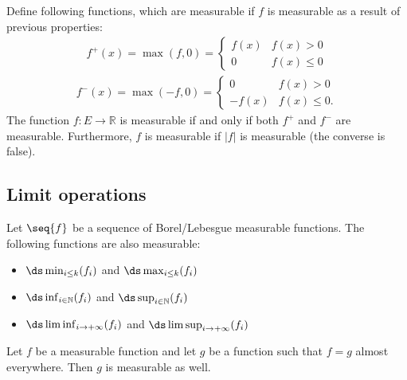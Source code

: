     \begin{property}
        Define following functions, which are measurable if $f$ is measurable as a result of previous properties:
        \begin{gather}
            \label{lebesgue:positive_part}
            f^+(x) = \max(f,0) =
            \begin{cases}
                f(x)&f(x)>0\\
                0&f(x)\leq0
            \end{cases}
        \end{gather}
        \begin{gather}
            \label{lebesgue:negative_part}
            f^-(x) = \max(-f,0) =
            \begin{cases}
                0&f(x)>0\\
                -f(x)&f(x)\leq0.
            \end{cases}
        \end{gather}
        The function $f:E\rightarrow\mathbb{R}$ is measurable if and only if both $f^+$ and $f^-$ are measurable. Furthermore, $f$ is measurable if $|f|$ is measurable (the converse is false).
    \end{property}

\subsection{Limit operations}

    \begin{property}
        Let $\seq{f}$ be a sequence of Borel/Lebesgue measurable functions. The following functions are also measurable:
        \begin{itemize}
            \item $\ds\min_{i\leq k}(f_i)$ and $\ds\max_{i\leq k}(f_i)$
            \item $\ds\inf_{i\in\mathbb{N}}(f_i)$ and $\ds\sup_{i\in\mathbb{N}}(f_i)$
            \item $\ds\liminf_{i\rightarrow+\infty}(f_i)$ and $\ds\limsup_{i\rightarrow+\infty}(f_i)$
        \end{itemize}
    \end{property}

    \begin{property}
        Let $f$ be a measurable function and let $g$ be a function such that $f=g$ almost everywhere. Then $g$ is measurable as well.
    \end{property}


